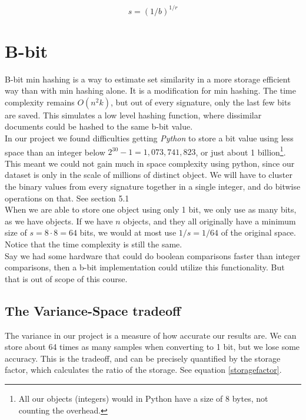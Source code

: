 \documentclass[a4paper,11pt]{article}
\begin{document}
\begin{equation}
    s = (1/b)^{1/r}
    \label{eq:s-estimate}
\end{equation}


\section{B-bit}
B-bit min hashing is a way to estimate set similarity in a more storage efficient way than with min hashing alone. It is a modification for min hashing. The time complexity remains $O(n^2k)$, but out of every signature, only the last few bits are saved. This simulates a low level hashing function, where dissimilar documents could be hashed to the same b-bit value. \\

In our project we found difficulties getting \emph{Python} to store a bit value using less space than an integer below $2^{30}-1 = 1,073,741,823$, or just about 1 billion\footnote{All our objects (integers) would in Python have a size of 8 bytes, not counting the overhead.}. This meant we could not gain much in space complexity using python, since our dataset is only in the scale of millions of distinct object. We will have to cluster the binary values from every signature together in a single integer, and do bitwise operations on that. See \cite{article:bbit} section 5.1  \\

When we are able to store one object using only 1 bit, we only use as many bits, as we have objects. If we have $n$ objects, and they all originally have a minimum size of $s = 8 \cdot 8 = 64$ bits, we would at most use $1/s = 1/64$ of the original space. Notice that the time complexity is still the same. \\

Say we had some hardware that could do boolean comparisons faster than integer comparisons, then a b-bit implementation could utilize this functionality. But that is out of scope of this course. \\


\subsection{The Variance-Space tradeoff}
The variance in our project is a measure of how accurate our results are. We can store about 64 times as many samples when converting to 1 bit, but we lose some accuracy. This is the tradeoff, and can be precisely quantified by the storage factor, which calculates the ratio of the  storage. See equation \ref{storagefactor}.
\end{document}

